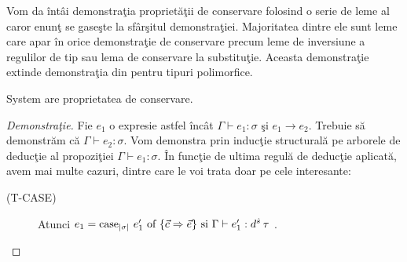 Vom da \^ int\^ ai demonstra\c tia propriet\u a\c tii de conservare folosind o serie de leme al caror enun\c t se gase\c ste la sf\^ ar\c situl demonstra\c tiei. Majoritatea dintre ele sunt leme care apar \^ in orice de\-mon\-stra\-\c ti\-e de conservare precum leme de inversiune a regulilor de tip sau lema de conservare la substitu\c tie. Aceasta demonstra\c tie extinde demonstra\c tia din \citep{967408} pentru tipuri polimorfice.
\begin{proposition}
System \fhat are proprietatea de conservare.
\end{proposition}

\begin{proof}[Demonstra\c tie]
Fie $e_1$ o expresie astfel \^ inc\^ at $\Gamma \vdash e_1 : \sigma $ \c si $e_1 \to e_2$. Trebuie s\u a demonstr\u am c\u a $\Gamma \vdash e_2:\sigma$. Vom demonstra prin induc\c tie structural\u a pe arborele de deduc\c tie al propozi\c tiei $\Gamma \vdash e_1 : \sigma $. \^ In func\c tie de ultima regul\u a de deduc\c tie aplicat\u a, avem mai multe cazuri, dintre care le voi trata doar pe cele interesante:
\begin{description}
  \item[{\scriptsize (T-CASE)}] Atunci $e_1 = \text{case}_{|\sigma|}\ e_1' \text{ of } \{ \vec{c}\Rightarrow \vec{e} \} \text{ si } \Gamma \vdash e_1' : d^{\hat{s}}\hspace{2pt}\tau $ .
\end{description}
\end{proof}
